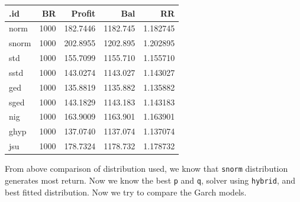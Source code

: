 \documentclass[]{tufte-book}
\newenvironment{Shaded}{}{}
\newcommand{\KeywordTok}[1]{\textcolor[rgb]{0.00,0.44,0.13}{\textbf{#1}}}
\newcommand{\DataTypeTok}[1]{\textcolor[rgb]{0.56,0.13,0.00}{#1}}
\newcommand{\DecValTok}[1]{\textcolor[rgb]{0.25,0.63,0.44}{#1}}
\newcommand{\StringTok}[1]{\textcolor[rgb]{0.25,0.44,0.63}{#1}}
\newcommand{\CommentTok}[1]{\textcolor[rgb]{0.38,0.63,0.69}{\textit{#1}}}
\newcommand{\ControlFlowTok}[1]{\textcolor[rgb]{0.00,0.44,0.13}{\textbf{#1}}}
\newcommand{\OperatorTok}[1]{\textcolor[rgb]{0.40,0.40,0.40}{#1}}
\newcommand{\NormalTok}[1]{#1}
\begin{document}
\begin{Shaded}
\end{Shaded}

\begin{longtable}[]{@{}lrrrr@{}}
\toprule
.id & BR & Profit & Bal & RR\tabularnewline
\midrule
\endhead
norm & 1000 & 182.7446 & 1182.745 & 1.182745\tabularnewline
snorm & 1000 & 202.8955 & 1202.895 & 1.202895\tabularnewline
std & 1000 & 155.7099 & 1155.710 & 1.155710\tabularnewline
sstd & 1000 & 143.0274 & 1143.027 & 1.143027\tabularnewline
ged & 1000 & 135.8819 & 1135.882 & 1.135882\tabularnewline
sged & 1000 & 143.1829 & 1143.183 & 1.143183\tabularnewline
nig & 1000 & 163.9009 & 1163.901 & 1.163901\tabularnewline
ghyp & 1000 & 137.0740 & 1137.074 & 1.137074\tabularnewline
jsu & 1000 & 178.7324 & 1178.732 & 1.178732\tabularnewline
\bottomrule
\end{longtable}

From above comparison of distribution used, we know that \texttt{snorm}
distribution generates most return. Now we know the best \texttt{p} and
\texttt{q}, solver using \texttt{hybrid}, and best fitted distribution.
Now we try to compare the Garch models.
\end{document}
